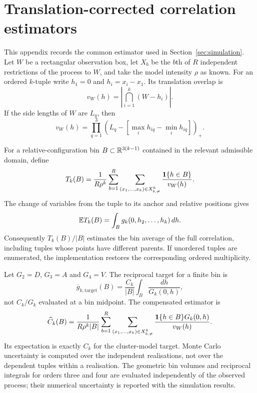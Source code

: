 \section{Translation-corrected correlation estimators}
\label{app:estimators}

This appendix records the common estimator used in Section~\ref{sec:simulation}. Let $W$ be a rectangular observation box, let $X_b$ be the $b$th of $R$ independent restrictions of the process to $W$, and take the model intensity $\rho$ as known. For an ordered $k$-tuple write $h_1=0$ and $h_i=x_i-x_1$. Its translation overlap is
\[
 v_W(h)=\left|\bigcap_{i=1}^k(W-h_i)\right|.
\]
If the side lengths of $W$ are $L_q$, then
\[
 v_W(h)=\prod_{q=1}^3\left(L_q-\left[\max_i h_{iq}-\min_i h_{iq}\right]\right)_+.
\]

For a relative-configuration bin $B\subset\mathbb R^{3(k-1)}$ contained in the relevant admissible domain, define
\begin{equation}
 T_k(B)=\frac{1}{R\rho^k}\sum_{b=1}^R
 \sum_{(x_1,\ldots,x_k)\in X_{b,\ne}^k}
 \frac{\mathbf 1\{h\in B\}}{v_W(h)}.
 \label{eq:Tk-estimator}
\end{equation}
The change of variables from the tuple to its anchor and relative positions gives
\[
 \mathbb E T_k(B)=\int_B g_k(0,h_2,\ldots,h_k)\,dh.
\]
Consequently $T_k(B)/|B|$ estimates the bin average of the full correlation, including tuples whose points have different parents. If unordered tuples are enumerated, the implementation restores the corresponding ordered multiplicity.

Let $G_2=D$, $G_3=A$ and $G_4=V$. The reciprocal target for a finite bin is
\begin{equation}
 \overline g_{k,\mathrm{target}}(B)
 =\frac{C_k}{|B|}\int_B\frac{dh}{G_k(0,h)},
 \label{eq:bin-target}
\end{equation}
not $C_k/G_k$ evaluated at a bin midpoint. The compensated estimator is
\begin{equation}
 \widehat C_k(B)=\frac{1}{R\rho^k|B|}\sum_{b=1}^R
 \sum_{(x_1,\ldots,x_k)\in X_{b,\ne}^k}
 \frac{\mathbf 1\{h\in B\}G_k(0,h)}{v_W(h)}.
 \label{eq:compensated-estimator}
\end{equation}
Its expectation is exactly $C_k$ for the cluster-model target. Monte Carlo uncertainty is computed over the independent realisations, not over the dependent tuples within a realisation. The geometric bin volumes and reciprocal integrals for orders three and four are evaluated independently of the observed process; their numerical uncertainty is reported with the simulation results.

